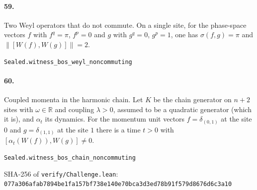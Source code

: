 \documentclass[11pt]{article}
\begin{document}
\paragraph{59.} Two Weyl operators that do not commute. On a single site, for the phase-space vectors $f$ with $f^q = \pi$, $f^p = 0$ and $g$ with $g^q = 0$, $g^p = 1$, one has $\sigma(f, g) = \pi$ and $\|[W(f), W(g)]\| = 2$.\par{\footnotesize\texttt{Sealed.witness\_bos\_weyl\_noncommuting}}

\paragraph{60.} Coupled momenta in the harmonic chain. Let $K$ be the chain generator on $n + 2$ sites with $\omega \in \mathbb R$ and coupling $\lambda > 0$, assumed to be a quadratic generator (which it is), and $\alpha_t$ its dynamics. For the momentum unit vectors $f = \delta_{(0, 1)}$ at the site $0$ and $g = \delta_{(1, 1)}$ at the site $1$ there is a time $t > 0$ with $[\alpha_t(W(f)), W(g)] \ne 0$.\par{\footnotesize\texttt{Sealed.witness\_bos\_chain\_noncommuting}}

\vfill{\footnotesize SHA-256 of \texttt{verify/Challenge.lean}: \texttt{077a306afab7894be1fa157bf738e140e70bca3d3ed78b91f579d8676d6c3a10}}
\end{document}
